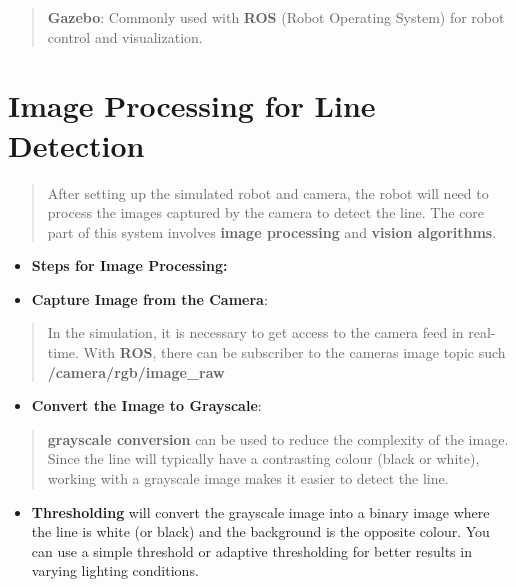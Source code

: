 \documentclass[../../main]{subfiles}
\begin{document}
    \begin{quote}
    \textbf{Gazebo}: Commonly used with \textbf{ROS} (Robot Operating
    System) for robot control and visualization.
    \end{quote}
    
    
      \section*{Image Processing for Line Detection}
    
    
    \begin{quote}
    After setting up the simulated robot and camera, the robot will need to
    process the images captured by the camera to detect the line. The core
    part of this system involves \textbf{image processing} and
    \textbf{vision algorithms}.
    \end{quote}
    
    \begin{itemize}
    \item
      \textbf{Steps for Image Processing:}
    \end{itemize}
    
    \begin{itemize}
    \item
      \textbf{Capture Image from the Camera}:
    \end{itemize}
    
    \begin{quote}
    In the simulation, it is necessary to get access to the camera feed in
    real-time. With \textbf{ROS}, there can be subscriber to the
    camera\textquotesingle s image topic such
    \textbf{/camera/rgb/image\_raw}
    \end{quote}
    
    \begin{itemize}
    \item
      \textbf{Convert the Image to Grayscale}:
    \end{itemize}
    
    \begin{quote}
    \textbf{grayscale conversion} can be used to reduce the complexity of
    the image. Since the line will typically have a contrasting colour
    (black or white), working with a grayscale image makes it easier to
    detect the line.
    \end{quote}
    
    \begin{itemize}
    \item
      \textbf{Thresholding} will convert the grayscale image into a binary
      image where the line is white (or black) and the background is the
      opposite colour. You can use a simple threshold or adaptive
      thresholding for better results in varying lighting conditions.
    \end{itemize}
    
\end{document}

